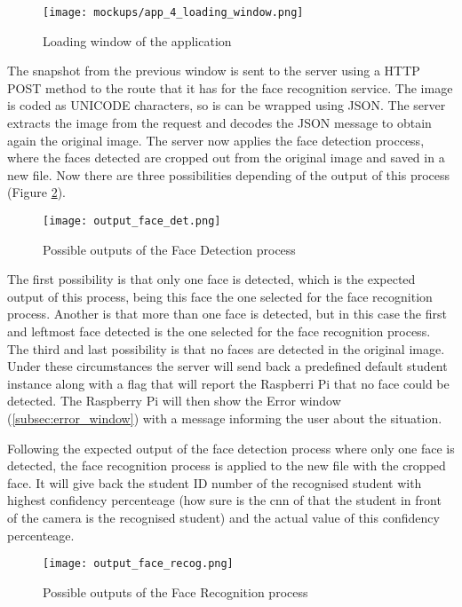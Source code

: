 	\begin{figure}[!ht]
		\centering
		\texttt{[image: mockups/app\_4\_loading\_window.png]}
		\caption{Loading window of the application}
		\label{fig:loading_window}
	\end{figure}

	The snapshot from the previous window is sent to the server using a HTTP POST method to the route that it has for the face recognition service. The image is coded as UNICODE characters, so is can be wrapped using JSON. The server extracts the image from the request and decodes the JSON message to obtain again the original image. The server now applies the face detection proccess, where the faces detected are cropped out from the original image and saved in a new file. Now there are three possibilities depending of the output of this process (Figure \ref{fig:output_face_det}).

	\begin{figure}[!ht]
		\centering
		\texttt{[image: output\_face\_det.png]}
		\caption{Possible outputs of the Face Detection process}
		\label{fig:output_face_det}
	\end{figure}

	The first possibility is that only one face is detected, which is the expected output of this process, being this face the one selected for the face recognition process. Another is that more than one face is detected, but in this case the first and leftmost face detected is the one selected for the face recognition process. The third and last possibility is that no faces are detected in the original image. Under these circumstances the server will send back a predefined default student instance along with a flag that will report the Raspberri Pi that no face could be detected. The Raspberry Pi will then show the Error window (\ref{subsec:error_window}) with a message informing the user about the situation.

	Following the expected output of the face detection process where only one face is detected, the face recognition process is applied to the new file with the cropped face. It will give back the student ID number of the recognised student with highest confidency percenteage (how sure is the \gls{cnn} of that the student in front of the camera is the recognised student) and the actual value of this confidency percenteage. 

	\begin{figure}[!ht]
		\centering
		\texttt{[image: output\_face\_recog.png]}
		\caption{Possible outputs of the Face Recognition process}
		\label{fig:output_face_recog}
	\end{figure}

